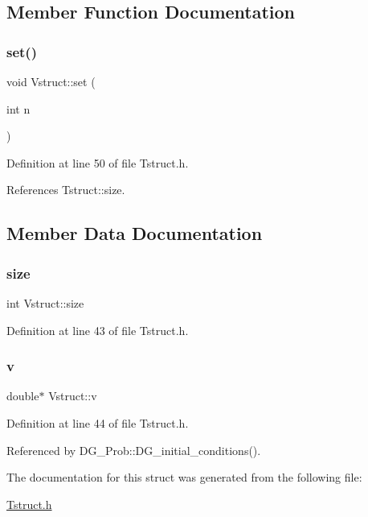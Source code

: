 \subsection{Member Function Documentation}
\mbox{\label{structVstruct_a3c675742e102dc021c4d9a32285acb6f}} 
\subsubsection{\texorpdfstring{set()}{set()}}
{\footnotesize\ttfamily void Vstruct\+::set (\begin{DoxyParamCaption}\item[{int}]{n }\end{DoxyParamCaption})\hspace{0.3cm}{\ttfamily [inline]}}



Definition at line 50 of file Tstruct.\+h.



References Tstruct\+::size.



\subsection{Member Data Documentation}
\mbox{\label{structVstruct_a652f51550c7f173e94ab318318f8b2ad}} 
\subsubsection{\texorpdfstring{size}{size}}
{\footnotesize\ttfamily int Vstruct\+::size}



Definition at line 43 of file Tstruct.\+h.

\mbox{\label{structVstruct_ab7d3a313e027a65c847a6edf11ddffe5}} 
\subsubsection{\texorpdfstring{v}{v}}
{\footnotesize\ttfamily double$\ast$ Vstruct\+::v}



Definition at line 44 of file Tstruct.\+h.



Referenced by D\+G\+\_\+\+Prob\+::\+D\+G\+\_\+initial\+\_\+conditions().



The documentation for this struct was generated from the following file\+:\begin{DoxyCompactItemize}
\item 
\hyperlink{Tstruct_8h}{Tstruct.\+h}\end{DoxyCompactItemize}
